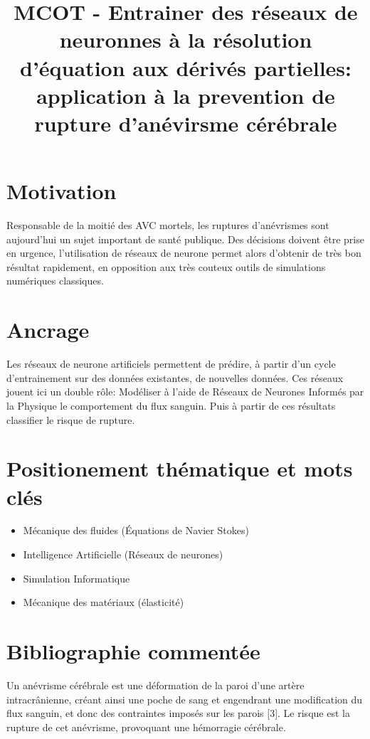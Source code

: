 \documentclass{article}
\title{MCOT - Entrainer des réseaux de neuronnes à la résolution d'équation aux dérivés partielles: application à la prevention de rupture d'anévirsme cérébrale}
\begin{document}
	\maketitle
	
	\section{Motivation}
	
Responsable de la moitié des AVC mortels, les ruptures d'anévrismes sont aujourd'hui un sujet important de santé publique. Des décisions doivent être prise en urgence, l'utilisation de réseaux de neurone permet alors d'obtenir de très bon résultat rapidement, en opposition aux très couteux outils de simulations numériques classiques.

	\section{Ancrage}
	
	Les réseaux de neurone artificiels permettent de prédire, à partir d'un cycle d'entrainement sur des données existantes, de nouvelles données. Ces réseaux jouent ici un double rôle: Modéliser à l'aide de Réseaux de Neurones Informés par la Physique le comportement du flux sanguin. Puis à partir de ces résultats classifier le risque de rupture.

	\section{Positionement thématique et mots clés}
	
\begin{itemize}
	\item Mécanique des fluides (Équations de Navier Stokes)
	\item Intelligence Artificielle (Réseaux de neurones)
	\item Simulation Informatique
	\item Mécanique des matériaux (élasticité)
\end{itemize}
	
	\section{Bibliographie commentée}
	
Un anévrisme cérébrale est une déformation de la paroi d'une artère intracrânienne, créant ainsi une poche de sang et engendrant une modification du flux sanguin, et donc des contraintes imposés sur les parois [3]. Le risque est la rupture de cet anévrisme, provoquant une hémorragie cérébrale. 
\end{document}
